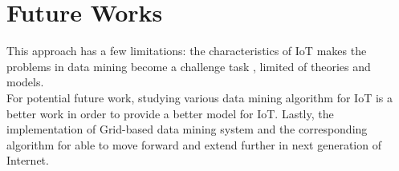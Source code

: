 \documentclass[a4paper,12pt]{article}
\begin{document}
{\section{Future Works}
This approach has a few limitations: the characteristics of IoT makes the problems in data mining become a challenge task , limited of theories and models.\\
\indent
For potential future work, studying various data mining algorithm for IoT is a better work in order to provide a better model for IoT. Lastly, the implementation of Grid-based data mining system  and the corresponding algorithm for able to move forward and extend further in next generation of Internet.
{}
}
\end{document}
